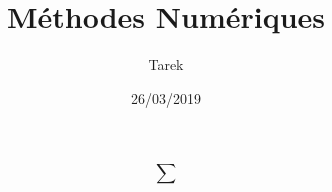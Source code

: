 \documentclass[11pts]{article}
\title{Méthodes Numériques}
\author{Tarek}
\date{26/03/2019}
\begin{document}
\maketitle
$$
\sum
$$

\end{document}
